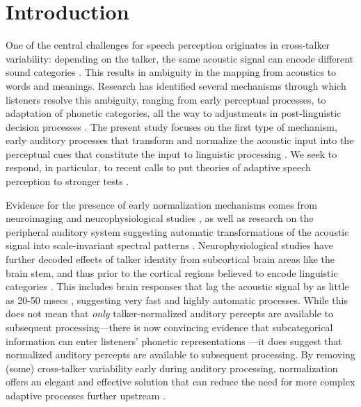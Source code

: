 \documentclass[preprint]{JASA}
\begin{document}
\section{Introduction}\label{sec:intro}

One of the central challenges for speech perception originates in cross-talker variability: depending on the talker, the same acoustic signal can encode different sound categories \citep{allen2003, liberman1967, newman2001}. This results in ambiguity in the mapping from acoustics to words and meanings. Research has identified several mechanisms through which listeners resolve this ambiguity, ranging from early perceptual processes, to adaptation of phonetic categories, all the way to adjustments in post-linguistic decision processes \citep[for review, see][]{xie2023}. The present study focuses on the first type of mechanism, early auditory processes that transform and normalize the acoustic input into the perceptual cues that constitute the input to linguistic processing \citep[for reviews,][]{barreda2020, johnson-sjerps2021, mcmurray-jongman2011, stilp2020, weatherholtz-jaeger2016}. We seek to respond, in particular, to recent calls to put theories of adaptive speech perception to stronger tests \citep{baeseberk2018, schertz-clare2020, xie2023}.

Evidence for the presence of early normalization mechanisms comes from neuroimaging and neurophysiological studies \citep[e.g.,][]{oganian2023, skoe2021}, as well as research on the peripheral auditory system suggesting automatic transformations of the acoustic signal into scale-invariant spectral patterns \citep[e.g.,][]{patterson2014, smith2005}. Neurophysiological studies have further decoded effects of talker identity from subcortical brain areas like the brain stem, and thus prior to the cortical regions believed to encode linguistic categories \citep[e.g.,][]{sjerps2019, tang2017}. This includes brain responses that lag the acoustic signal by as little as 20-50 msecs \citep{lee2009}, suggesting very fast and highly automatic processes. While this does not mean that \emph{only} talker-normalized auditory percepts are available to subsequent processing---there is now convincing evidence that subcategorical information can enter listeners' phonetic representations \citep[e.g.,][]{hay2017, hay2019, johnson1999, mcgowan2015, walker-hay2011}---it does suggest that normalized auditory percepts are available to subsequent processing. By removing (some) cross-talker variability early during auditory processing, normalization offers an elegant and effective solution that can reduce the need for more complex adaptive processes further upstream \citep{apfelbaum-mcmurray2015, xie2023}.
\end{document}
